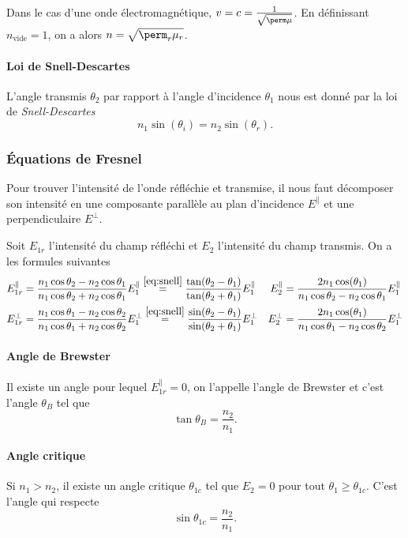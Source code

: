 Dans le cas d'une onde électromagnétique,
$v = c = \frac{1}{\sqrt{\perm\mu}}$.
En définissant $n_\mathrm{vide} = 1$,
on a alors
$n = \sqrt{\perm_r\mu_r}$.

\paragraph{Loi de Snell-Descartes}
L'angle transmis $\theta_2$ par rapport à l'angle d'incidence
$\theta_1$ nous est donné par la loi de \emph{Snell-Descartes}
\begin{equation}
  \label{eq:snell}
  n_1 \sin(\theta_i) = n_2 \sin(\theta_r).
\end{equation}

\subsubsection{Équations de Fresnel}
Pour trouver l'intensité de l'onde réfléchie et transmise, il nous
faut décomposer son intensité en une composante parallèle au plan d'incidence
$E^\parallel$ et une perpendiculaire $E^\perp$.

Soit $E_{1r}$ l'intensité du champ réfléchi
et $E_{2}$ l'intensité du champ transmis.
On a les formules suivantes
\begin{align*}
  E_{1r}^\parallel & = \frac{n_1\cos\theta_2 - n_2\cos\theta_1}
  {n_1\cos\theta_2 + n_2\cos\theta_1}E_{1}^\parallel
  \stackrel{\eqref{eq:snell}}{=}
  \frac{\tan(\theta_2 - \theta_1)}{\tan(\theta_2 + \theta_1)}E_1^\parallel
  & E_2^\parallel & = \frac{2n_1\cos(\theta_1)}
  {n_1\cos\theta_2 - n_2\cos\theta_1}E_{1}^\parallel\\
  E_{1r}^\perp & = \frac{n_1\cos\theta_1 - n_2\cos\theta_2}
  {n_1\cos\theta_1 + n_2\cos\theta_2}E_{1}^\perp
  \stackrel{\eqref{eq:snell}}{=}
  \frac{\sin(\theta_2 - \theta_1)}{\sin(\theta_2 + \theta_1)}E_1^\perp
  & E_2^\perp & = \frac{2n_1\cos(\theta_1)}
  {n_1\cos\theta_1 - n_2\cos\theta_2}E_{1}^\perp\\
\end{align*}

\paragraph{Angle de Brewster}
Il existe un angle pour lequel $E_{1r}^\parallel = 0$,
on l'appelle l'angle de Brewster et c'est l'angle $\theta_B$ tel que
\[ \tan\theta_B = \frac{n_2}{n_1}. \]

\paragraph{Angle critique}
Si $n_1 > n_2$, il existe un angle critique $\theta_{1c}$ tel que
$E_{2} = 0$ pour tout $\theta_1 \geq \theta_{1c}$.
C'est l'angle qui respecte
\[ \sin\theta_{1c} = \frac{n_2}{n_1}. \]

